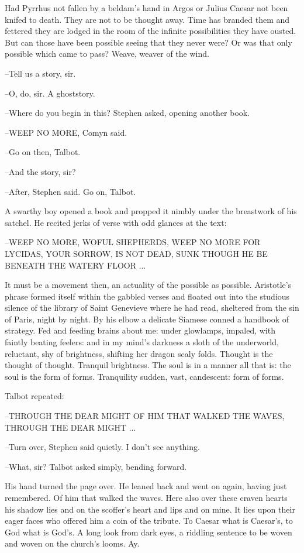 Had Pyrrhus not fallen by a beldam's hand in Argos or Julius Caesar not
been knifed to death. They are not to be thought away. Time has branded
them and fettered they are lodged in the room of the infinite
possibilities they have ousted. But can those have been possible seeing
that they never were? Or was that only possible which came to pass?
Weave, weaver of the wind.

--Tell us a story, sir.

--O, do, sir. A ghoststory.

--Where do you begin in this? Stephen asked, opening another book.

--WEEP NO MORE, Comyn said.

--Go on then, Talbot.

--And the story, sir?

--After, Stephen said. Go on, Talbot.

A swarthy boy opened a book and propped it nimbly under the breastwork of
his satchel. He recited jerks of verse with odd glances at the text:


  --WEEP NO MORE, WOFUL SHEPHERDS, WEEP NO MORE
    FOR LYCIDAS, YOUR SORROW, IS NOT DEAD,
    SUNK THOUGH HE BE BENEATH THE WATERY FLOOR ...


It must be a movement then, an actuality of the possible as possible.
Aristotle's phrase formed itself within the gabbled verses and floated
out into the studious silence of the library of Saint Genevieve where he
had read, sheltered from the sin of Paris, night by night. By his elbow a
delicate Siamese conned a handbook of strategy. Fed and feeding brains
about me: under glowlamps, impaled, with faintly beating feelers: and in
my mind's darkness a sloth of the underworld, reluctant, shy of
brightness, shifting her dragon scaly folds. Thought is the thought of
thought. Tranquil brightness. The soul is in a manner all that is: the
soul is the form of forms. Tranquility sudden, vast, candescent: form of
forms.

Talbot repeated:


  --THROUGH THE DEAR MIGHT OF HIM THAT WALKED THE WAVES,
    THROUGH THE DEAR MIGHT ...


--Turn over, Stephen said quietly. I don't see anything.

--What, sir? Talbot asked simply, bending forward.

His hand turned the page over. He leaned back and went on again,
having just remembered. Of him that walked the waves. Here also over
these craven hearts his shadow lies and on the scoffer's heart and lips
and on mine. It lies upon their eager faces who offered him a coin of the
tribute. To Caesar what is Caesar's, to God what is God's. A long look
from dark eyes, a riddling sentence to be woven and woven on the church's
looms. Ay.


